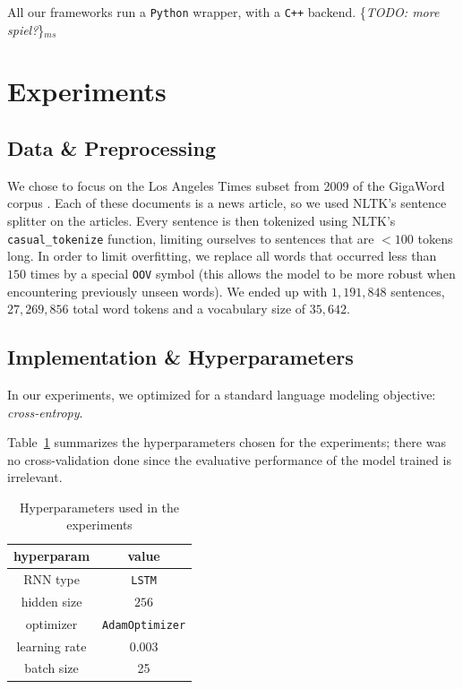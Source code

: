 \documentclass{article}
\newcommand{\ms}[1]{{\color{cyan}\{\textit{#1}\}$_{ms}$}}
\begin{document}
All our frameworks run a \texttt{Python} wrapper, with a \texttt{C++} backend.
\ms{TODO: more spiel?}

\section{Experiments}
\subsection{Data \& Preprocessing}
We chose to focus on the Los Angeles Times subset from 2009 of the GigaWord corpus \cite{gigaword}. Each of these documents is a news article, so we used NLTK’s \cite{nltk} sentence splitter on the articles. Every sentence is then tokenized using NLTK’s \verb!casual_tokenize! function, limiting ourselves to sentences that are $<100$ tokens long. In order to limit overfitting, we replace all words that occurred less than $150$ times by a special \verb!OOV! symbol (this allows the model to be more robust when encountering previously unseen words). We ended up with $1,191,848$ sentences, $27,269,856$ total word tokens and a vocabulary size of $35,642$.

\subsection{Implementation \& Hyperparameters}
In our experiments, we optimized for a standard language modeling objective: \textit{cross-entropy}.

Table~\ref{tab:hyperparams} summarizes the hyperparameters chosen for the experiments; there was no cross-validation done since the evaluative performance of the model trained is irrelevant.
\begin{table}\begin{center}
\begin{tabular}{cc}
\textbf{hyperparam} & \textbf{value} \\\hline
RNN type & \texttt{LSTM} \\
hidden size & $256$ \\
optimizer & \texttt{AdamOptimizer} \\
learning rate & $0.003$ \\
batch size & 25 \\
\end{tabular}
\caption{\label{tab:hyperparams}Hyperparameters used in the experiments}
\end{center}\end{table}
\end{document}
